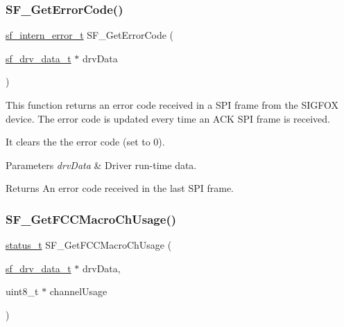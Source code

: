 \subsubsection{\texorpdfstring{SF\_GetErrorCode()}{SF\_GetErrorCode()}}
{\footnotesize\ttfamily \mbox{\hyperlink{group__sf__enum__group_ga9f14f69f90dfff97b98977db7a73ba68}{sf\+\_\+intern\+\_\+error\+\_\+t}} S\+F\+\_\+\+Get\+Error\+Code (\begin{DoxyParamCaption}\item[{\mbox{\hyperlink{structsf__drv__data__t}{sf\+\_\+drv\+\_\+data\+\_\+t}} $\ast$}]{drv\+Data }\end{DoxyParamCaption})}



This function returns an error code received in a S\+PI frame from the S\+I\+G\+F\+OX device. The error code is updated every time an A\+CK S\+PI frame is received. 

It clears the the error code (set to 0).


\begin{DoxyParams}{Parameters}
{\em drv\+Data} & Driver run-\/time data.\\
\hline
\end{DoxyParams}
\begin{DoxyReturn}{Returns}
An error code received in the last S\+PI frame. 
\end{DoxyReturn}
\mbox{\label{group__sf__functions__group_ga06e1aa9eda09f899eb5af74991da9bf3}} 
\subsubsection{\texorpdfstring{SF\_GetFCCMacroChUsage()}{SF\_GetFCCMacroChUsage()}}
{\footnotesize\ttfamily \mbox{\hyperlink{group__ksdk__common_gaaabdaf7ee58ca7269bd4bf24efcde092}{status\+\_\+t}} S\+F\+\_\+\+Get\+F\+C\+C\+Macro\+Ch\+Usage (\begin{DoxyParamCaption}\item[{\mbox{\hyperlink{structsf__drv__data__t}{sf\+\_\+drv\+\_\+data\+\_\+t}} $\ast$}]{drv\+Data,  }\item[{uint8\+\_\+t $\ast$}]{channel\+Usage }\end{DoxyParamCaption})}



